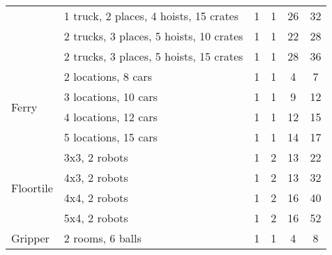 \documentclass{article}
\begin{document}
\begin{table}[bt!]
{\begin{tabular}{ll|cc|cc}
                                & 1 truck, 2 places, 4 hoists, 15 crates              & 1                       & 1                        & 26                       & 32                       \\
                                & 2 trucks, 3 places, 5 hoists, 10 crates                & 1                       & 1                        & 22                      & 28                       \\
                                & 2 trucks, 3 places, 5 hoists, 15 crates              & 1                       & 1                        & 28                      & 36                       \\ \midrule
\multirow{4}{*}{Ferry}       & 2 locations, 8 cars               & 1                       & 1                        & 4                       & 7                        \\
                                & 3 locations, 10 cars              & 1                       & 1                        & 9                       & 12                       \\
                                & 4 locations, 12 cars              & 1                       & 1                        & 12                      & 15                       \\
                                & 5 locations, 15 cars              & 1                       & 1                        & 14                      & 17                       \\ \midrule
\multirow{4}{*}{Floortile}   & 3x3, 2 robots                     & 1                       & 2                        & 13                      & 22                       \\
                                & 4x3, 2 robots                     & 1                       & 2                        & 13                      & 32                       \\
                                & 4x4, 2 robots                     & 1                       & 2                        & 16                      & 40                       \\
                                & 5x4, 2 robots                     & 1                       & 2                        & 16                      & 52                       \\ \midrule
\multirow{4}{*}{Gripper}        & 2 rooms, 6 balls                  & 1                       & 1                        & 4                       & 8                        \\

\end{tabular}}
\end{table}
\end{document}

